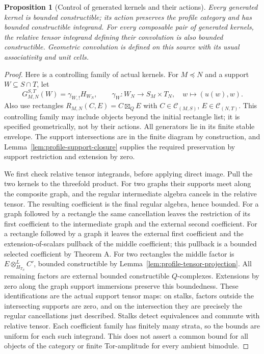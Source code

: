 \documentclass[11pt]{article}
\newtheorem{proposition}[theorem]{Proposition}
\theoremstyle{definition}
\theoremstyle{remark}
\begin{document}
\begin{proposition}[Control of generated kernels and their actions]
\label{prop:profile-kernel-control}
Every generated kernel is bounded constructible; its action preserves
the profile category and has bounded constructible integrand.
For every composable pair of generated kernels, the relative tensor
integrand defining their convolution is also bounded constructible.
Geometric convolution is defined on this source with its usual
associativity and unit cells.
\end{proposition}
\begin{proof}
Here is a controlling family of actual kernels.  For $M\preceq N$
and a support $W\subseteq S\cap T$, let
\[
 G_{M,N}^{S,T}(W)=\gamma_{W,!}H_{W_N},\qquad
 \gamma_W:W_N\longrightarrow S_M\times T_N,
 \quad w\longmapsto(u(w),w).
\]
Also use rectangles $R_{M,N}(C,E)=C\boxtimes_Q E$ with
$C\in\mathcal C_{(M,S)}$, $E\in\mathcal C_{(N,T)}$.
This controlling family may include objects beyond the initial
rectangle list; it is specified geometrically, not by their actions.
All generators lie in its finite stable envelope. The support
intersections are in the finite diagram by construction, and
Lemma~\ref{lem:profile-support-closure} supplies the required
preservation by support restriction and extension by zero.

We first check relative tensor integrands, before applying direct
image. Pull the two kernels to the threefold product. For two
graphs their supports meet along the composite graph, and the
regular intermediate algebra cancels in the relative tensor.
The resulting coefficient is the final regular algebra, hence
bounded. For a graph followed by a rectangle the same cancellation
leaves the restriction of its first coefficient to the intermediate
graph and the external second coefficient. For a rectangle followed
by a graph it leaves the external first coefficient and the
extension-of-scalars pullback of the middle coefficient; this
pullback is a bounded selected coefficient by Theorem A.
For two rectangles the middle factor is
$E\otimes^L_{H_{T_N}}C'$, bounded constructible by
Lemma~\ref{lem:profile-tensor-projection}. All remaining factors
are external bounded constructible $Q$-complexes. Extensions by
zero along the graph support immersions preserve this boundedness.
These identifications are the actual support tensor maps: on stalks,
factors outside the intersecting supports are zero, and on the
intersection they are precisely the regular cancellations just
described. Stalks detect equivalences and commute with relative
tensor. Each coefficient family has finitely many strata, so the
bounds are uniform for each such integrand. This does not assert
a common bound for all objects of the category or finite Tor-amplitude
for every ambient bimodule.


\end{proof}
\end{document}
